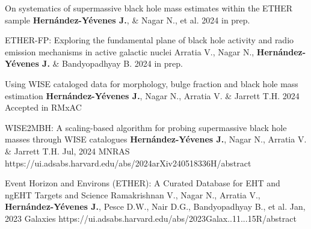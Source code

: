 
\begin{cvpublications}{}

	 {On systematics of supermassive black hole mass estimates within the ETHER sample}
	 {\textbf{Hernández-Yévenes J.}, \& Nagar N., et al.}
	 {2024}
     {in prep.}
     {}

	 {ETHER-FP: Exploring the fundamental plane of black hole activity and radio emission mechanisms in active galactic nuclei}
	 {Arratia V., Nagar N., \textbf{Hernández-Yévenes J.} \& Bandyopadhyay B.}
	 {2024}
     {in prep.}
     {}
     
	 {Using WISE cataloged data for morphology, bulge fraction and black hole mass estimation}
	 {\textbf{Hernández-Yévenes J.}, Nagar N., Arratia V. \& Jarrett T.H.}
	 {2024}
     {Accepted in RMxAC}
     {}
     
	 {WISE2MBH: A scaling-based algorithm for probing supermassive black hole masses through WISE catalogues}
	 {\textbf{Hernández-Yévenes J.}, Nagar N., Arratia V. \& Jarrett T.H.}
	 {Jul, 2024}
     {MNRAS}
     {https://ui.adsabs.harvard.edu/abs/2024arXiv240518336H/abstract}

	{Event Horizon and Environs (ETHER): A Curated Database for EHT and ngEHT Targets and Science}
	{Ramakrishnan V., Nagar N., Arratia V., \textbf{Hernández-Yévenes J.}, Pesce D.W., Nair D.G., Bandyopadhyay B., et al.}
    {Jan, 2023}
	{Galaxies}
    {https://ui.adsabs.harvard.edu/abs/2023Galax..11...15R/abstract}

\end{cvpublications}
